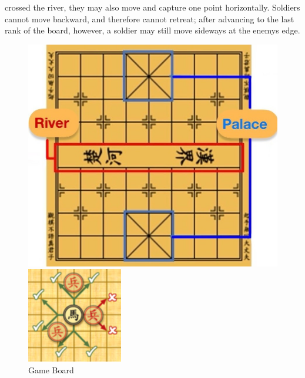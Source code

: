 \documentclass[12pt,a4paper]{article}
\begin{document}
crossed the river, they may also move and capture one point
horizontally. Soldiers cannot move backward, and therefore cannot
retreat; after advancing to the last rank of the board, however, a
soldier may still move sideways at the enemy\textquotesingle s edge.
\begin{figure}[htbp]
    \centering
    \begin{minipage}[b]{0.3\textwidth}
        \centering
        \includegraphics[width=\linewidth]{Xiangqi.assets/Board.jpg}
        \caption{Game Board}
    \end{minipage}
    \begin{minipage}[b]{0.25\textwidth}
        \centering
        \includegraphics[width=\linewidth]{Xiangqi.assets/180px-MovementOfHorsePiece.png}

\end{minipage}
\end{figure}
\end{document}
